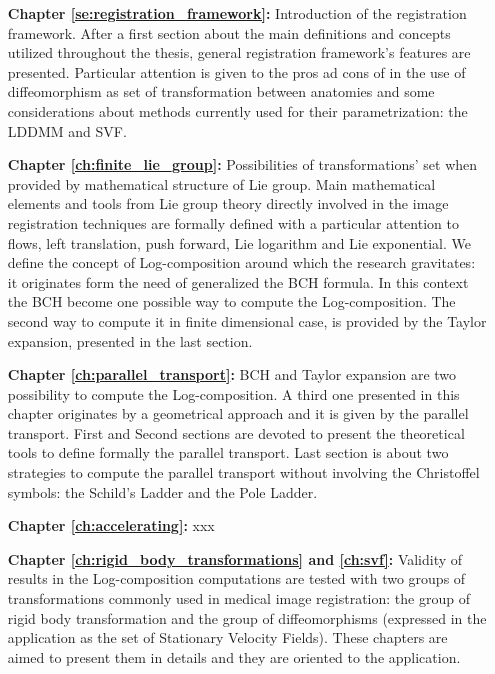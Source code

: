 \begin{enumerate}
	\item[{\bf Chapter \ref{se:registration_framework}:}] Introduction of the registration framework. After a first section about the main definitions and concepts utilized throughout the thesis, general registration framework's features are presented. Particular attention is given to the pros ad cons of in the use of diffeomorphism as set of transformation between anatomies and some considerations about methods currently used for their parametrization: the LDDMM and SVF. 
	
	\item[{\bf Chapter \ref{ch:finite_lie_group}:}] Possibilities of transformations' set when provided by mathematical structure of Lie group. Main mathematical elements and tools from Lie group theory directly involved in the image registration techniques are formally defined with a particular attention to flows, left translation, push forward, Lie logarithm and Lie exponential. We define the concept of Log-composition around which the research gravitates: it originates form the need of generalized the BCH formula. In this context the BCH become one possible way to compute the Log-composition. The second way to compute it in finite dimensional case, is provided by the Taylor expansion, presented in the last section.
	
	\item[{\bf Chapter \ref{ch:parallel_transport}:}] BCH and Taylor expansion are two possibility to compute the Log-composition. A third one presented in this chapter originates by a geometrical approach and it is given by the parallel transport. First and Second sections are devoted to present the theoretical tools to define formally the parallel transport. Last section is about two strategies to compute the parallel transport without involving the Christoffel symbols: the Schild's Ladder and the Pole Ladder.
	
	\item[{\bf Chapter \ref{ch:accelerating}:}] xxx
	
	\item[{\bf Chapter \ref{ch:rigid_body_transformations} and \ref{ch:svf}:}] Validity of results in the Log-composition computations are tested with two groups of transformations commonly used in medical image registration: the group of rigid body transformation and the group of diffeomorphisms (expressed in the application as the set of Stationary Velocity Fields). These chapters are aimed to present them in details and they are oriented to the application. 
	

\end{enumerate}
